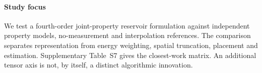 \paragraph{Study focus} We test a fourth-order joint-property reservoir formulation against independent property models, no-measurement and interpolation references. The comparison separates representation from energy weighting, spatial truncation, placement and estimation. Supplementary Table~S7 gives the closest-work matrix. An additional tensor axis is not, by itself, a distinct algorithmic innovation.
